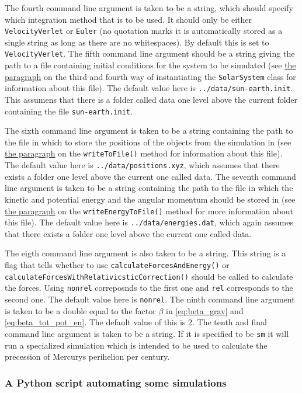 \documentclass[reprint,english,notitlepage]{revtex4-1}  %
\begin{document}
The fourth command line argument is taken to be a string, which should specify which integration method that is to be used. It should only be either \verb+VelocityVerlet+ or \verb+Euler+ (no quotation marks it is automatically stored as a single string as long as there are no whitespaces). By default this is set to \verb+VelocityVerlet+. The fifth command line argument should be a string giving the path to a file containing initial conditions for the system to be simulated (see \hyperref[poi:initfile]{the paragraph} on the third and fourth way of instantiating the \verb+SolarSystem+ class for information about this file). The default value here is \verb+../data/sun-earth.init+. This assumens that there is a folder called data one level above the current folder containing the file \verb+sun-earth.init+.

The sixth command line argument is taken to be a string containing the path to the file in which to store the positions of the objects from the simulation in (see \hyperref[poi:write_to_file]{the paragraph} on the \verb+writeToFile()+ method for information about this file). The default value here is \verb+../data/positions.xyz+, which assumes that there exists a folder one level above the current one called data. The seventh command line argument is taken to be a string containing the path to the file in which the kinetic and potential energy and the angular momentum should be stored in (see \hyperref[poi:write_energy_to_file]{the paragraph} on the \verb+writeEnergyToFile()+ method for more information about this file). The default value here is \verb+../data/energies.dat+, which again assumes that there exists a folder one level above the current one called data.

The eigth command line argument is also taken to be a string. This string is a flag that tells whether to use \verb+calculateForcesAndEnergy()+ or \verb+calculateForcesWithRelativicsticCorrection()+ should be called to calculate the forces. Using \verb+nonrel+ correposnds to the first one and \verb+rel+ corresponds to the second one. The default value here is \verb+nonrel+. The ninth command line argument is taken to be a double equal to the factor $\beta$ in \eqref{eq:beta_grav} and \eqref{eq:beta_tot_pot_en}. The default value of this is 2. The tenth and final command line argument is taken to be a string. If it is specified to be \verb+sm+ it will run a specialized simulation which is intended to be used to calculate the precession of Mercurys perihelion per century.


\subsubsection{A Python script automating some simulations} \label{sec:III:a:5}
\end{document}

